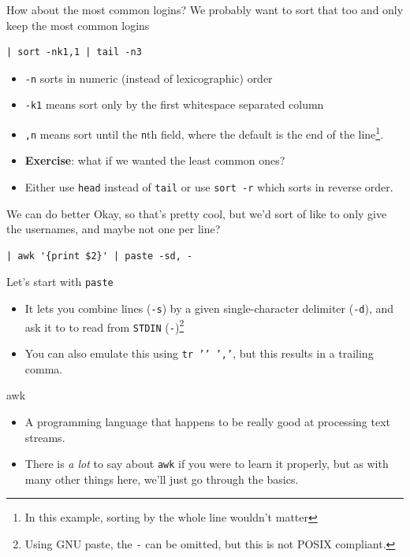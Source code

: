\documentclass[12pt]{beamer}
\begin{document}
\begin{frame}[fragile]{How about the most common logins?}
  We probably want to sort that too and only keep the most common logins
  \begin{verbatim}
| sort -nk1,1 | tail -n3
  \end{verbatim}
  \begin{itemize}
    \item \texttt{-n} sorts in numeric (instead of lexicographic) order
    \item \texttt{-k1} means sort only by the first whitespace separated column
    \item \texttt{,n} means sort until the \texttt{n}th field, where the default is the end of the line\footnote{In this example, sorting by the whole line wouldn’t matter}.
    \item \textbf{Exercise}: what if we wanted the least common ones?\pause
    \item Either use \texttt{head} instead of \texttt{tail} or use \texttt{sort -r} which sorts in reverse order.
  \end{itemize}
\end{frame}

\begin{frame}[fragile]{We can do better}
  Okay, so that’s pretty cool, but we’d sort of like to only give the usernames, and maybe not one per line?
  \begin{verbatim}
| awk '{print $2}' | paste -sd, -
  \end{verbatim}
  Let's start with \texttt{paste}
  \begin{itemize}
    \item It lets you combine lines (\texttt{-s}) by a given single-character delimiter (\texttt{-d}), and ask it to to read from \texttt{STDIN} (\texttt{-})\footnote{Using GNU paste, the \texttt{-} can be omitted, but this is not POSIX compliant.}
    \item You can also emulate this using \texttt{tr '\n' ','}, but this results in a trailing comma.
  \end{itemize}
\end{frame}

\begin{frame}{awk}
  \begin{itemize}
    \item A programming language that happens to be really good at processing text streams.
    \item There is \emph{a lot} to say about \texttt{awk} if you were to learn it properly, but as with many other things here, we’ll just go through the basics.
  \end{itemize}
\end{frame}
\end{document}
